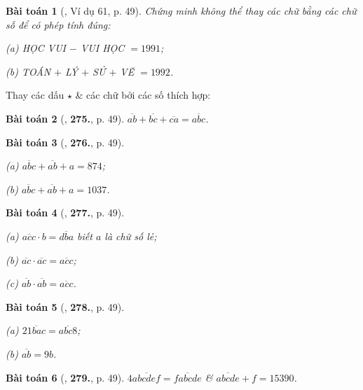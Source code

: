 \documentclass{article}
\numberwithin{equation}{section}
\newtheorem{baitoan}{Bài toán}
\begin{document}
\begin{baitoan}[\cite{Binh_Toan_6_tap_1}, Ví dụ 61, p. 49]
	Chứng minh không thể thay các chữ bằng các chữ số để có phép tính đúng:
	\begin{enumerate*}
		\item[(a)] \emph{HỌC VUI $-$ VUI HỌC} $= 1991$;
		\item[(b)] \emph{TOÁN $+$ LÝ $+$ SỬ $+$ VẼ} $= 1992$.
	\end{enumerate*}
\end{baitoan}
Thay các dấu $\star$ \& các chữ bởi các số thích hợp:

\begin{baitoan}[\cite{Binh_Toan_6_tap_1}, \textbf{275.}, p. 49]
	$\overline{ab} + \overline{bc} + \overline{ca} = \overline{abc}$.
\end{baitoan}

\begin{baitoan}[\cite{Binh_Toan_6_tap_1}, \textbf{276.}, p. 49]
	\begin{enumerate*}
		\item[(a)] $\overline{abc} + \overline{ab} + a = 874$;
		\item[(b)] $\overline{abc} + \overline{ab} + a = 1037$.
	\end{enumerate*}
\end{baitoan}

\begin{baitoan}[\cite{Binh_Toan_6_tap_1}, \textbf{277.}, p. 49]
	\begin{enumerate*}
		\item[(a)] $\overline{acc}\cdot b = \overline{dba}$ biết $a$ là chữ số lẻ;
		\item[(b)] $\overline{ac}\cdot\overline{ac} = \overline{acc}$;
		\item[(c)] $\overline{ab}\cdot\overline{ab} = \overline{acc}$.
	\end{enumerate*}
\end{baitoan}

\begin{baitoan}[\cite{Binh_Toan_6_tap_1}, \textbf{278.}, p. 49]
	\begin{enumerate*}
		\item[(a)] $2\overline{1bac} = \overline{abc8}$;
		\item[(b)] $\overline{ab} = 9b$.
	\end{enumerate*}
\end{baitoan}

\begin{baitoan}[\cite{Binh_Toan_6_tap_1}, \textbf{279.}, p. 49]
	$4\overline{abcdef} = \overline{fabcde}$ \& $\overline{abcde} + f = 15390$.
\end{baitoan}
\end{document}
